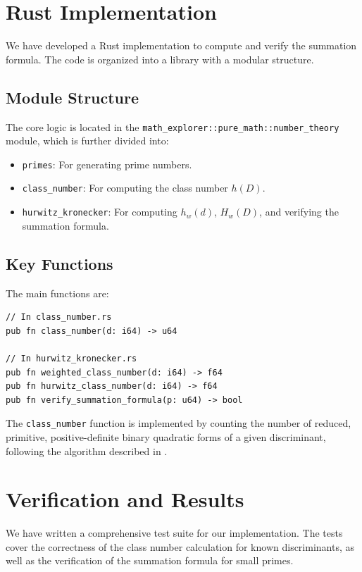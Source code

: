 \documentclass{article}
\begin{document}
\section{Rust Implementation}

We have developed a Rust implementation to compute and verify the summation formula. The code is organized into a library with a modular structure.

\subsection{Module Structure}

The core logic is located in the \texttt{math\_explorer::pure\_math::number\_theory} module, which is further divided into:
\begin{itemize}
    \item \texttt{primes}: For generating prime numbers.
    \item \texttt{class\_number}: For computing the class number $h(D)$.
    \item \texttt{hurwitz\_kronecker}: For computing $h_w(d)$, $H_w(D)$, and verifying the summation formula.
\end{itemize}

\subsection{Key Functions}

The main functions are:

\begin{verbatim}
// In class_number.rs
pub fn class_number(d: i64) -> u64

// In hurwitz_kronecker.rs
pub fn weighted_class_number(d: i64) -> f64
pub fn hurwitz_class_number(d: i64) -> f64
pub fn verify_summation_formula(p: u64) -> bool
\end{verbatim}

The \texttt{class\_number} function is implemented by counting the number of reduced, primitive, positive-definite binary quadratic forms of a given discriminant, following the algorithm described in \cite{cohen1993course}.

\section{Verification and Results}

We have written a comprehensive test suite for our implementation. The tests cover the correctness of the class number calculation for known discriminants, as well as the verification of the summation formula for small primes.
\end{document}
